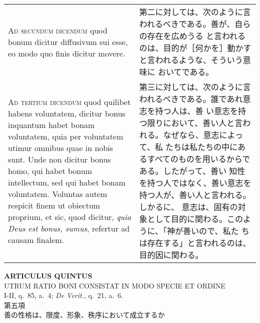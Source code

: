 \documentclass[10pt]{jsarticle} %
\begin{document}
\begin{longtable}{p{21em}p{21em}}
\\


{\scshape Ad secundum dicendum} quod bonum dicitur diffusivum sui esse, eo
 modo quo finis dicitur movere.

&


第二に対しては、次のように言われるべきである。善が、自らの存在を広めうる
 と言われるのは、目的が［何かを］動かすと言われるような、そういう意味に
 おいてである。

\\


{\scshape Ad tertium dicendum} quod quilibet habens voluntatem, dicitur
 bonus inquantum habet bonam voluntatem, quia per voluntatem utimur
 omnibus quae in nobis sunt. Unde non dicitur bonus homo, qui habet
 bonum intellectum, sed qui habet bonam voluntatem. Voluntas autem
 respicit finem ut obiectum proprium, et sic, quod dicitur, {\itshape
 quia Deus est bonus, sumus}, refertur ad causam finalem.

&


第三に対しては、次のように言われるべきである。誰であれ意志を持つ人は、善
 い意志を持つ限りにおいて、善い人と言われる。なぜなら、意志によって、私
 たちは私たちの中にあるすべてのものを用いるからである。したがって、善い
 知性を持つ人ではなく、善い意志を持つ人が、善い人と言われる。しかるに、
 意志は、固有の対象として目的に関わる。このように、「神が善いので、私た
 ちは存在する」と言われるのは、目的因に関わる。



\end{longtable}
\newpage
{}
 
\begin{center}
 {\Large {\bf ARTICULUS QUINTUS}}\\
 {\large UTRUM RATIO BONI CONSISTAT IN MODO SPECIE ET ORDINE}\\
 {\footnotesize I-II, q.~85, a.~4; {\itshape De Verit.}, q.~21, a.~6.}\\
 {\Large 第五項\\善の性格は、限度、形象、秩序において成立するか}
\end{center}
\end{document}
